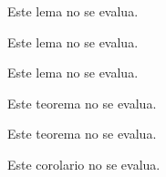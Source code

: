 
  \begin{lemma}
    \PN Este lema no se evalua.
  \end{lemma}

  \begin{lemma}
    \PN Este lema no se evalua.
  \end{lemma}

  \begin{lemma}
    \PN Este lema no se evalua.
  \end{lemma}

  \begin{theorem}
    \PN Este teorema no se evalua.
  \end{theorem}

  \begin{theorem}
    \PN Este teorema no se evalua.
  \end{theorem}

  \begin{corollary}
    \PN Este corolario no se evalua.
  \end{corollary}
